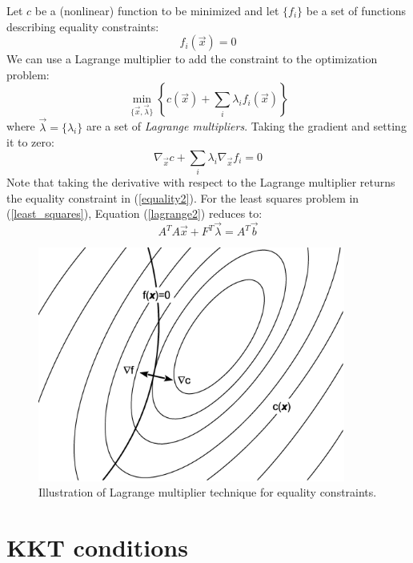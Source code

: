 \documentclass{article}
\newcommand{\mat}{A}
\newcommand{\sol}{b}
\newcommand{\eqmat}{F}
\newcommand{\cost}{c}
\newcommand{\eqfn}{f}
\newcommand{\coord}{x}
\begin{document}
Let $\cost$ be a (nonlinear) function to be minimized and let $\lbrace \eqfn_i \rbrace$ be a set of functions describing equality constraints:
\begin{equation}
	\eqfn_i(\vec \coord) = 0
 	\label{equality2}
\end{equation}
We can use a Lagrange multiplier to add the constraint to the optimization
problem:
\begin{equation}
	\min_{\lbrace \vec \coord, \vec \lambda \rbrace} \left \lbrace \cost(\vec \coord) + \sum_i \lambda_i \eqfn_i(\vec \coord) \right \rbrace
\end{equation}
where $\vec \lambda=\lbrace \lambda_i \rbrace$ are a set of {\it Lagrange multipliers}.
Taking the gradient and setting it to zero:
\begin{equation}
	\nabla_{\vec \coord} \cost + \sum_i \lambda_i \nabla_{\vec \coord} \eqfn_i = 0 
	\label{lagrange2}
\end{equation}
Note that taking the derivative with respect to the Lagrange multiplier
returns the equality constraint in (\ref{equality2}).
For the least squares problem in (\ref{least_squares}), 
Equation (\ref{lagrange2}) reduces to:
\begin{equation}
	\mat^T \mat \vec \coord + \eqmat^T \vec \lambda = \mat^T \vec \sol
\end{equation}
\citep{Lawson_Hanson1995}

\begin{figure}
	\includegraphics[width=0.9\textwidth]{Lagrange.eps}
	\caption{Illustration of Lagrange multiplier technique for equality constraints.}
\end{figure}

\section{KKT conditions}
\end{document}
